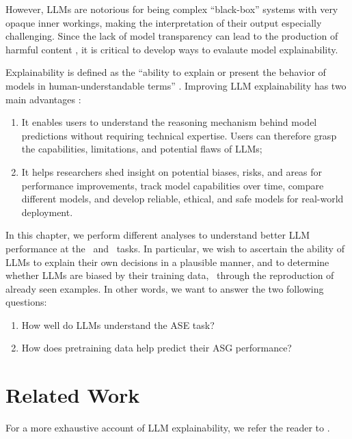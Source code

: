 However, LLMs are notorious for being complex ``black-box'' systems with very opaque inner workings, making the interpretation of their output especially challenging. Since the lack of model transparency can lead to the production of harmful content \citep{weidinger2021ethical}, it is critical to develop ways to evalaute model explainability.

Explainability is defined as the ``ability to explain or present the behavior of models in human-understandable terms'' \citep{doshi2017towards}. Improving LLM explainability has two main advantages \citep{zhao2024explainability}:

\begin{enumerate}
    \item It enables users to understand the reasoning mechanism behind model predictions without requiring technical expertise. Users can therefore grasp the capabilities, limitations, and potential flaws of LLMs;
    \item It helps researchers shed insight on potential biases, risks, and areas for performance improvements, track model capabilities over time, compare different models, and develop reliable, ethical, and safe models for real-world deployment.
\end{enumerate}

In this chapter, we perform different analyses to understand better LLM performance at the \ase\ and \asg\ tasks. In particular, we wish to ascertain the ability of LLMs to explain their own decisions in a plausible manner, and to determine whether LLMs are biased by their training data, {\eg}\ through the reproduction of already seen examples. In other words, we want to answer the two following questions:

\begin{enumerate}
    \item How well do LLMs understand the ASE task?
    \item How does pretraining data help predict their ASG performance?
\end{enumerate}

\section{Related Work}
\label{sec:expl_related_work}

For a more exhaustive account of LLM explainability, we refer the reader to \citet{zhao2024explainability}.

